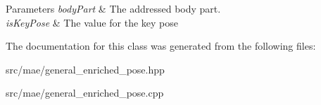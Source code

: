 \begin{DoxyParams}{Parameters}
{\em body\-Part} & The addressed body part. \\
\hline
{\em is\-Key\-Pose} & The value for the key pose \\
\hline
\end{DoxyParams}


The documentation for this class was generated from the following files\-:\begin{DoxyCompactItemize}
\item 
src/mae/general\-\_\-enriched\-\_\-pose.\-hpp\item 
src/mae/general\-\_\-enriched\-\_\-pose.\-cpp\end{DoxyCompactItemize}
